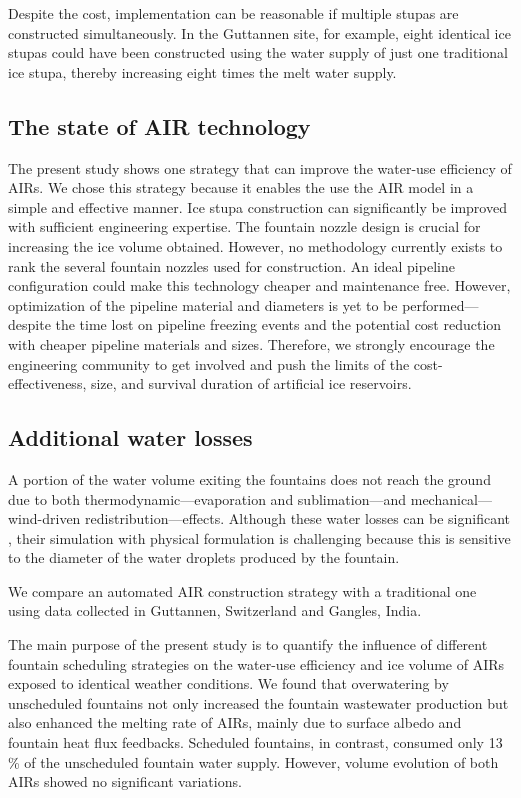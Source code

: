 \documentclass[tc, manuscript]{copernicus}
\begin{document}
Despite the cost, implementation can be reasonable if multiple stupas are constructed simultaneously. In the Guttannen site, for example, eight identical ice stupas could have been constructed
using the water supply of just one traditional ice stupa, thereby increasing eight times the melt water supply.

\subsection{The state of AIR technology}

The present study shows one strategy that can improve the water-use efficiency of AIRs. We chose this strategy because it enables the use the AIR model in a simple and effective manner. Ice stupa construction can significantly be improved with sufficient
engineering expertise. The
fountain nozzle design is crucial for increasing the ice volume obtained. However, no methodology currently
exists to rank the several fountain nozzles used for construction. An ideal pipeline configuration could make
this technology cheaper and maintenance free. However, optimization of the pipeline material and diameters is
yet to be performed---despite the time lost on pipeline freezing events and the potential cost
reduction with cheaper pipeline materials and sizes. Therefore, we strongly encourage the
engineering community to get involved and push the limits of the cost-effectiveness, size, and survival duration of artificial ice
reservoirs. 

\subsection{Additional water losses}

A portion of the water volume exiting the fountains does not reach the ground due to both thermodynamic---evaporation and sublimation---and mechanical---wind-driven redistribution---effects. Although these water losses can
be significant \citep{hanzerSimulationSnowManagement2020}, their simulation with physical formulation is
challenging because this is sensitive to the diameter of the water droplets produced by the fountain.

\conclusions

We compare an automated AIR construction strategy with a traditional one
using data collected in Guttannen, Switzerland and Gangles, India.

The main purpose of the present study is to quantify the influence of different fountain scheduling strategies on the
water-use efficiency and ice volume of AIRs exposed to identical weather conditions. We found that overwatering by
unscheduled fountains not only increased the fountain wastewater production but also enhanced the melting rate
of AIRs, mainly due to surface albedo and fountain heat flux feedbacks. Scheduled fountains, in contrast,
consumed only 13 \% of the unscheduled fountain water supply. However, volume evolution of both AIRs
showed no significant variations. 
\end{document}
